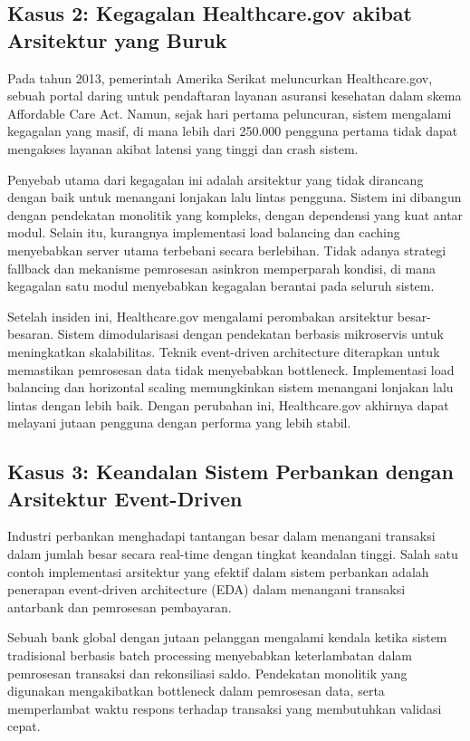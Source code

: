 \subsection{Kasus 2: Kegagalan Healthcare.gov akibat Arsitektur yang Buruk}

Pada tahun 2013, pemerintah Amerika Serikat meluncurkan Healthcare.gov, sebuah portal daring untuk pendaftaran layanan asuransi kesehatan dalam skema Affordable Care Act. Namun, sejak hari pertama peluncuran, sistem mengalami kegagalan yang masif, di mana lebih dari 250.000 pengguna pertama tidak dapat mengakses layanan akibat latensi yang tinggi dan crash sistem.

Penyebab utama dari kegagalan ini adalah arsitektur yang tidak dirancang dengan baik untuk menangani lonjakan lalu lintas pengguna. Sistem ini dibangun dengan pendekatan monolitik yang kompleks, dengan dependensi yang kuat antar modul. Selain itu, kurangnya implementasi load balancing dan caching menyebabkan server utama terbebani secara berlebihan. Tidak adanya strategi fallback dan mekanisme pemrosesan asinkron memperparah kondisi, di mana kegagalan satu modul menyebabkan kegagalan berantai pada seluruh sistem.

Setelah insiden ini, Healthcare.gov mengalami perombakan arsitektur besar-besaran. Sistem dimodularisasi dengan pendekatan berbasis mikroservis untuk meningkatkan skalabilitas. Teknik event-driven architecture diterapkan untuk memastikan pemrosesan data tidak menyebabkan bottleneck. Implementasi load balancing dan horizontal scaling memungkinkan sistem menangani lonjakan lalu lintas dengan lebih baik. Dengan perubahan ini, Healthcare.gov akhirnya dapat melayani jutaan pengguna dengan performa yang lebih stabil.

\subsection{Kasus 3: Keandalan Sistem Perbankan dengan Arsitektur Event-Driven}

Industri perbankan menghadapi tantangan besar dalam menangani transaksi dalam jumlah besar secara real-time dengan tingkat keandalan tinggi. Salah satu contoh implementasi arsitektur yang efektif dalam sistem perbankan adalah penerapan event-driven architecture (EDA) dalam menangani transaksi antarbank dan pemrosesan pembayaran.

Sebuah bank global dengan jutaan pelanggan mengalami kendala ketika sistem tradisional berbasis batch processing menyebabkan keterlambatan dalam pemrosesan transaksi dan rekonsiliasi saldo. Pendekatan monolitik yang digunakan mengakibatkan bottleneck dalam pemrosesan data, serta memperlambat waktu respons terhadap transaksi yang membutuhkan validasi cepat.

